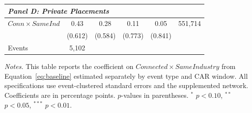 \begin{table}[htbp]
\begin{threeparttable}
\begin{tabular}{lccccc}
\midrule
\multicolumn{6}{l}{\textit{Panel D: Private Placements}} \\
\midrule
$Conn \times SameInd$ & 0.43 & 0.28 & 0.11 & 0.05 & 551,714 \\
 & (0.612) & (0.584) & (0.773) & (0.841) & \\[0.2em]
\quad Events & 5,102 &  &  &  & \\
\bottomrule
\end{tabular}
\begin{tablenotes}
\footnotesize
\item \textit{Notes.} This table reports the coefficient on $Connected \times SameIndustry$ from Equation~\ref{eq:baseline} estimated separately by event type and CAR window. All specifications use event-clustered standard errors and the supplemented network. Coefficients are in percentage points. $p$-values in parentheses. $^{*}$ $p<0.10$, $^{**}$ $p<0.05$, $^{***}$ $p<0.01$.
\end{tablenotes}
\end{threeparttable}
\end{table}